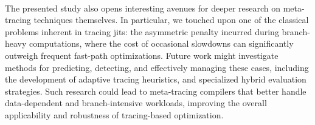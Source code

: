         \paragraph{}%
            The presented study also opens interesting avenues for deeper research on meta-tracing techniques themselves. In particular, we touched upon one of the classical problems inherent in tracing \glspl{jit}: the asymmetric penalty incurred during branch-heavy computations, where the cost of occasional slowdowns can significantly outweigh frequent fast-path optimizations. Future work might investigate methods for predicting, detecting, and effectively managing these cases, including the development of adaptive tracing heuristics, and specialized hybrid evaluation strategies. Such research could lead to meta-tracing compilers that better handle data-dependent and branch-intensive workloads, improving the overall applicability and robustness of tracing-based optimization.
